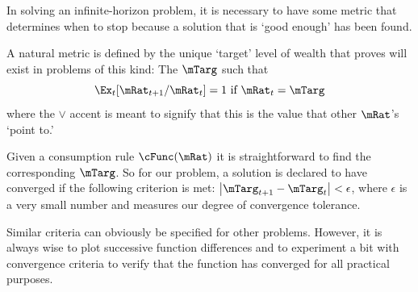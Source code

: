\documentclass[titlepage]{\econtex}
\begin{document}
In solving an infinite-horizon problem, it is necessary to have some
metric that determines when to stop because a solution that is `good
enough' has been found.

A natural metric is defined by the unique `target' level of wealth that \cite{BufferStockTheory} proves
will exist in problems of this kind: The $\mTarg$ such that
\begin{equation}
  \Ex_t [{\mRat}_{t+1}/\mRat_t] = 1 \mbox{~if~} \mRat_t = \mTarg  \label{eq:mTarget}
\end{equation}
where the $\vee$ accent is meant to signify that this is the value
that other $\mRat$'s `point to.'

Given a consumption rule $\cFunc(\mRat)$ it is straightforward to find
the corresponding $\mTarg$.  So for our problem, a solution is declared
to have converged if the following criterion is met:
$\left|\mTarg_{t+1}-\mTarg_{t}\right| < \epsilon$, where $\epsilon$ is
a very small number and measures our degree of convergence tolerance.

Similar criteria can obviously be specified for other problems.
However, it is always wise to plot successive function differences and
to experiment a bit with convergence criteria to verify that the
function has converged for all practical purposes.
\end{document}
